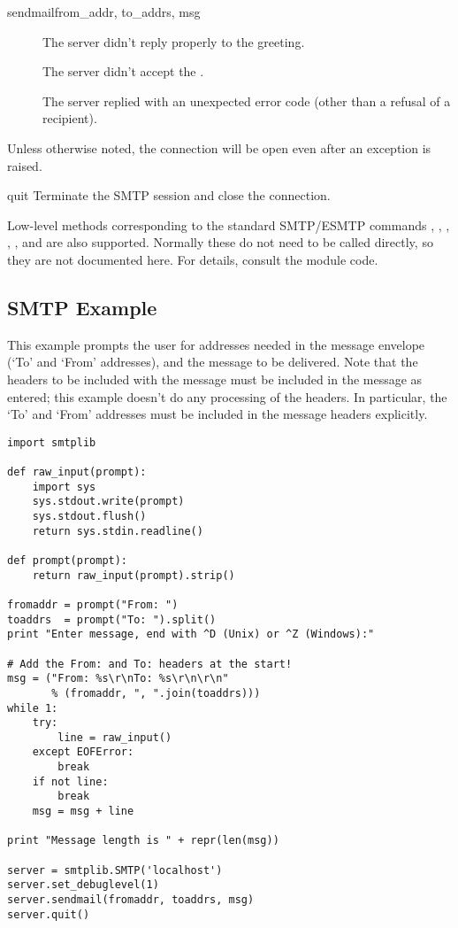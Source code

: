 \begin{methoddesc}{sendmail}{from_addr, to_addrs, msg}
\begin{description}
\item[]
The server didn't reply properly to the  greeting.

\item[]
The server didn't accept the .

\item[]
The server replied with an unexpected error code (other than a refusal
of a recipient).
\end{description}

Unless otherwise noted, the connection will be open even after
an exception is raised.

\end{methoddesc}

\begin{methoddesc}{quit}{}
Terminate the SMTP session and close the connection.
\end{methoddesc}

Low-level methods corresponding to the standard SMTP/ESMTP commands
, , , , , and
 are also supported.  Normally these do not need to be
called directly, so they are not documented here.  For details,
consult the module code.


\subsection{SMTP Example \label{SMTP-example}}

This example prompts the user for addresses needed in the message
envelope (`To' and `From' addresses), and the message to be
delivered.  Note that the headers to be included with the message must
be included in the message as entered; this example doesn't do any
processing of the  headers.  In particular, the `To' and
`From' addresses must be included in the message headers explicitly.

\begin{verbatim}
import smtplib

def raw_input(prompt):
    import sys
    sys.stdout.write(prompt)
    sys.stdout.flush()
    return sys.stdin.readline()

def prompt(prompt):
    return raw_input(prompt).strip()

fromaddr = prompt("From: ")
toaddrs  = prompt("To: ").split()
print "Enter message, end with ^D (Unix) or ^Z (Windows):"

# Add the From: and To: headers at the start!
msg = ("From: %s\r\nTo: %s\r\n\r\n"
       % (fromaddr, ", ".join(toaddrs)))
while 1:
    try:
        line = raw_input()
    except EOFError:
        break
    if not line:
        break
    msg = msg + line

print "Message length is " + repr(len(msg))

server = smtplib.SMTP('localhost')
server.set_debuglevel(1)
server.sendmail(fromaddr, toaddrs, msg)
server.quit()
\end{verbatim}
